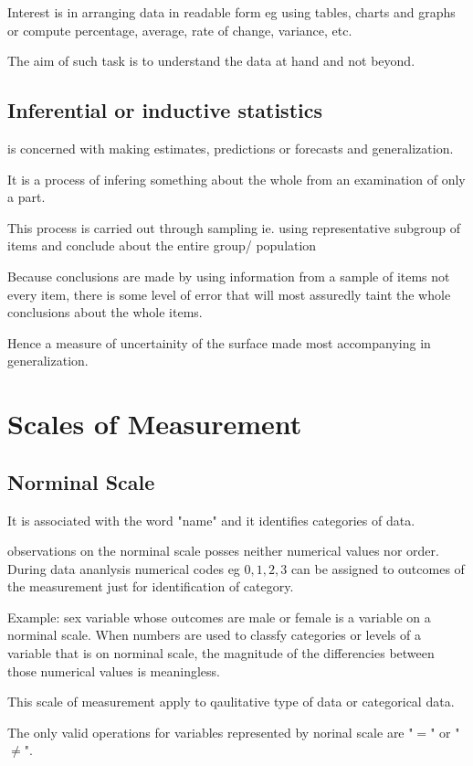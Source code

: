 \documentclass[12pt]{article}
\begin{document}
Interest is in arranging data in readable form eg using tables, charts and graphs or compute percentage, average, rate of change, variance, etc.

The aim of such task is to understand the data at hand and not beyond.

\subsection{Inferential or inductive statistics}is concerned with making estimates, predictions or forecasts and generalization.

It is  a process of infering something about the whole from an examination of only a part.

This process is carried out through sampling ie. using representative subgroup of items and conclude about the entire group/ population

Because conclusions are made by using information from a sample of items not every item, there is some level of error that will most assuredly taint the whole conclusions about the whole items.

Hence a measure of uncertainity of the surface made most accompanying in generalization.
\newpage

\section{Scales of Measurement}

\subsection{Norminal Scale}
It is associated with the word "name" and it identifies categories of data.

observations on the norminal scale posses neither numerical values nor order.
During data ananlysis numerical codes eg $0, 1, 2, 3$ can be assigned to outcomes of the measurement just for identification of category.

Example: sex variable whose outcomes are male or female is a variable on a norminal scale.
When numbers are used to classfy categories or levels of a variable that is on norminal scale, the magnitude of the differencies between those numerical values is meaningless.

This scale of measurement apply to qaulitative type of data or categorical data.

The only valid operations for variables represented by norinal scale are "$=$" or "$\neq$".
\end{document}
